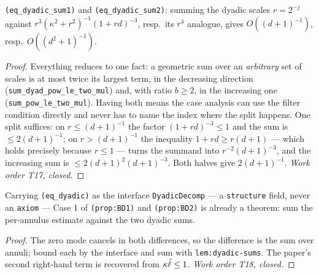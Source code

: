 \begin{lemma}\label{lem:dyadic-sums}
  \leanok
  \texttt{(eq\_dyadic\_sum1)} and \texttt{(eq\_dyadic\_sum2)}: summing the dyadic
  scales $r=2^{-j}$ against $r^{3}(\kappa^{2}+r^{2})^{-1}(1+rd)^{-3}$, resp.\ its
  $r^{4}$ analogue, gives $O((d+1)^{-1})$, resp.\ $O((d^{2}+1)^{-1})$.
\end{lemma}
\begin{proof}\leanok
  Everything reduces to one fact: a geometric sum over an \emph{arbitrary} set of
  scales is at most twice its largest term, in the decreasing direction
  (\texttt{sum\_dyad\_pow\_le\_two\_mul}) and, with ratio $b\ge2$, in the
  increasing one (\texttt{sum\_pow\_le\_two\_mul}).  Having both means the case
  analysis can use the filter condition directly and never has to name the index
  where the split happens.  One split suffices: on $r\le(d+1)^{-1}$ the factor
  $(1+rd)^{-3}\le1$ and the sum is $\le2(d+1)^{-1}$; on $r>(d+1)^{-1}$ the
  inequality $1+rd\ge r(d+1)$ --- which holds precisely because $r\le1$ ---
  turns the summand into $r^{-2}(d+1)^{-3}$, and the increasing sum is
  $\le2(d+1)^{2}(d+1)^{-3}$.  Both halves give $2(d+1)^{-1}$.
  \emph{Work order T17, closed.}
\end{proof}

\begin{lemma}\label{lem:dyadic-case1}
  \leanok
  Carrying \texttt{(eq\_dyadic)} as the interface \texttt{DyadicDecomp} --- a
  \texttt{structure} field, never an \texttt{axiom} --- Case 1 of
  \texttt{(prop:BD1)} and \texttt{(prop:BD2)} is already a theorem: sum the
  per-annulus estimate against the two dyadic sums.
\end{lemma}
\begin{proof}\leanok
  The zero mode cancels in both differences, so the difference is the sum over
  annuli; bound each by the interface and sum with \texttt{lem:dyadic-sums}.
  The paper's second right-hand term is recovered from $\kappa\hat\ell\le1$.
  \emph{Work order T18, closed.}
\end{proof}

